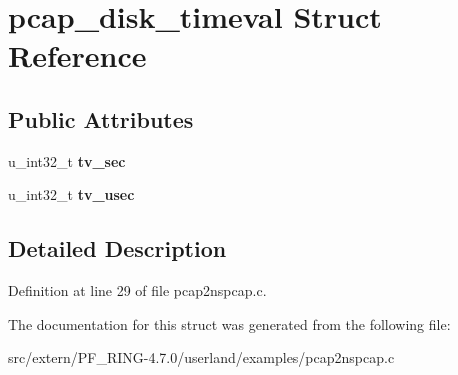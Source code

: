 \hypertarget{structpcap__disk__timeval}{
\section{pcap\_\-disk\_\-timeval Struct Reference}
\label{structpcap__disk__timeval}
}
\subsection*{Public Attributes}
\begin{DoxyCompactItemize}
\item 
\hypertarget{structpcap__disk__timeval_a815d9118fcaf48e7334678b4dbee6b6f}{
u\_\-int32\_\-t {\bfseries tv\_\-sec}}
\label{structpcap__disk__timeval_a815d9118fcaf48e7334678b4dbee6b6f}

\item 
\hypertarget{structpcap__disk__timeval_aee82dbdac732af13899e889bc3795d88}{
u\_\-int32\_\-t {\bfseries tv\_\-usec}}
\label{structpcap__disk__timeval_aee82dbdac732af13899e889bc3795d88}

\end{DoxyCompactItemize}


\subsection{Detailed Description}


Definition at line 29 of file pcap2nspcap.c.



The documentation for this struct was generated from the following file:\begin{DoxyCompactItemize}
\item 
src/extern/PF\_\-RING-\/4.7.0/userland/examples/pcap2nspcap.c\end{DoxyCompactItemize}
